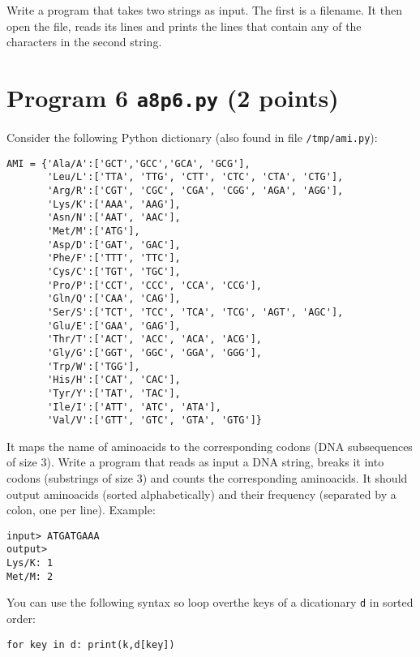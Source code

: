 \documentclass[12pt]{article}
\begin{document}
Write a program that takes two strings as input. The first is a filename. It then open the file, reads its lines and prints the lines that contain any of the characters in the second string.

\section{Program 6 {\tt a8p6.py} (2 points)}

Consider the following Python dictionary (also found in file {\tt /tmp/ami.py}):
\begin{verbatim}
AMI = {'Ala/A':['GCT','GCC','GCA', 'GCG'],
       'Leu/L':['TTA', 'TTG', 'CTT', 'CTC', 'CTA', 'CTG'],
       'Arg/R':['CGT', 'CGC', 'CGA', 'CGG', 'AGA', 'AGG'],
       'Lys/K':['AAA', 'AAG'],
       'Asn/N':['AAT', 'AAC'],
       'Met/M':['ATG'],
       'Asp/D':['GAT', 'GAC'], 
       'Phe/F':['TTT', 'TTC'],
       'Cys/C':['TGT', 'TGC'],
       'Pro/P':['CCT', 'CCC', 'CCA', 'CCG'],
       'Gln/Q':['CAA', 'CAG'],
       'Ser/S':['TCT', 'TCC', 'TCA', 'TCG', 'AGT', 'AGC'],
       'Glu/E':['GAA', 'GAG'], 
       'Thr/T':['ACT', 'ACC', 'ACA', 'ACG'],
       'Gly/G':['GGT', 'GGC', 'GGA', 'GGG'], 
       'Trp/W':['TGG'],
       'His/H':['CAT', 'CAC'], 
       'Tyr/Y':['TAT', 'TAC'],
       'Ile/I':['ATT', 'ATC', 'ATA'],
       'Val/V':['GTT', 'GTC', 'GTA', 'GTG']}
\end{verbatim}
It maps the name of aminoacids to the corresponding codons (DNA subsequences of size 3).
Write a program that reads as input a DNA string, breaks it into codons (substrings of size 3) and counts the corresponding aminoacids. It should output aminoacids (sorted alphabetically) and their frequency (separated by a colon, one per line). Example:
\begin{verbatim}
input> ATGATGAAA
output>
Lys/K: 1
Met/M: 2
\end{verbatim}
You can use the following syntax so loop overthe keys of a dicationary {\tt d} in sorted order:
\begin{verbatim}
for key in d: print(k,d[key])
\end{verbatim}
\end{document}
